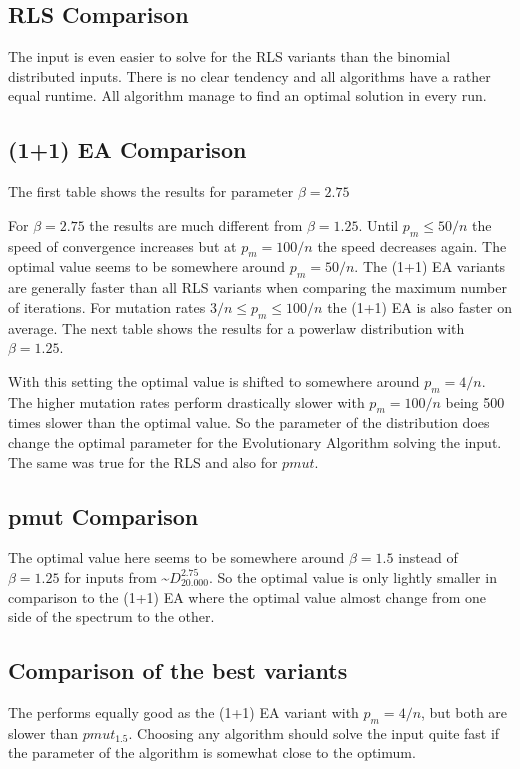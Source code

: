 \subsection{RLS Comparison}

The input is even easier to solve for the RLS variants than the binomial distributed inputs.
There is no clear tendency and all algorithms have a rather equal runtime.
All algorithm manage to find an optimal solution in every run.
\subsection{(1+1) EA Comparison}
The first table shows the results for parameter $\beta=2.75$



For $\beta=2.75$ the results are much different from $\beta=1.25$.
Until $p_m\le50/n$ the speed of convergence increases but at $p_m=100/n$ the speed decreases again.
The optimal value seems to be somewhere around $p_m=50/n$.
The (1+1) EA variants are generally faster than all RLS variants when comparing the maximum number of iterations.
For mutation rates $3/n\le p_m \le 100/n$ the (1+1) EA is also faster on average.
The next table shows the results for a powerlaw distribution with $\beta=1.25$.


With this setting the optimal value is shifted to somewhere around $p_m=4/n$.
The higher mutation rates perform drastically slower with $p_m=100/n$ being 500 times slower than the optimal value.
So the parameter of the distribution does change the optimal parameter for the Evolutionary Algorithm solving the input.
The same was true for the RLS and also for $pmut$.
\subsection{pmut Comparison}


The optimal value here seems to be somewhere around $\beta=1.5$ instead of $\beta =1.25$ for inputs from \textasciitilde$D^{2.75}_{20.000}$. 
So the optimal value is only lightly smaller in comparison to the (1+1) EA where the optimal value almost change from one side of the spectrum to the other.

\subsection{Comparison of the best variants}
The \RLSR[4] performs equally good as the (1+1) EA variant with $p_m=4/n$, but both are slower than $pmut_{1.5}$.
Choosing any algorithm should solve the input quite fast if the parameter of the algorithm is somewhat close to the optimum.

